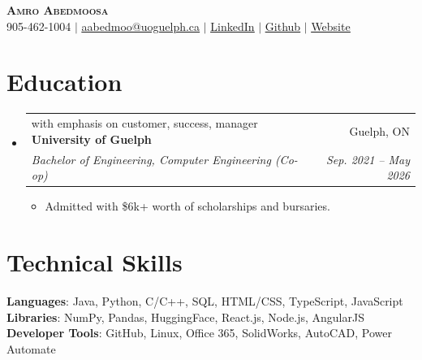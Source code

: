 \documentclass[letterpaper,11pt]{article}
\makeatletter
\newcommand{\resumeItem}[1]{
  \item\small{
    {#1 \vspace{-2pt}}
  }
}
\newcommand{\resumeSubheading}[4]{
  \vspace{-2pt}\item
    \begin{tabular*}{0.97\textwidth}[t]{l@{\extracolsep{\fill}}r}
 with emphasis on customer, success, manager
      \textbf{#1} & #2 \\
      \textit{\small#3} & \textit{\small #4} \\
    \end{tabular*}\vspace{-7pt}
}
\newcommand{\resumeSubHeadingListStart}{\begin{itemize}[leftmargin=0.15in, label={}]}
\newcommand{\resumeSubHeadingListEnd}{\end{itemize}}
\newcommand{\resumeItemListStart}{\begin{itemize}}
\newcommand{\resumeItemListEnd}{\end{itemize}\vspace{-5pt}}
\makeatother
\begin{document}

\begin{center}
    \textbf{\Huge \scshape Amro Abedmoosa} \\ \vspace{1pt}
    \small 905-462-1004 $|$ \href{mailto:aabedmoo@uguelph.ca}{\underline{aabedmoo@uoguelph.ca}} $|$ 
    \href{https://linkedin.com/in/amro-abedmoosa/}{\underline{LinkedIn}} $|$
    \href{https://github.com/amro212}{\underline{Github}}
    $|$
    \href{https://amro212.github.io/amro.portfolio/}{\underline{Website}}
\end{center}




\section{Education}
  \resumeSubHeadingListStart
    \resumeSubheading
      {University of Guelph}{Guelph, ON}
      {Bachelor of Engineering, Computer Engineering (Co-op)}{Sep. 2021 -- May 2026}
      \resumeItemListStart
            \resumeItem{Admitted with \$6k+ worth of scholarships and bursaries.}
      \resumeItemListEnd
  \resumeSubHeadingListEnd

\section{Technical Skills}
 \begin{itemize}[leftmargin=0.15in, label={}]
    \small{\item{
     \textbf{Languages}{: Java, Python, C/C++, SQL, HTML/CSS, TypeScript, JavaScript}\\
     \textbf{Libraries}{: NumPy, Pandas, HuggingFace, React.js, Node.js, AngularJS}\\
     \textbf{Developer Tools}{: GitHub, Linux, Office 365, SolidWorks, AutoCAD, Power Automate}}}
 \end{itemize}


\end{document}
